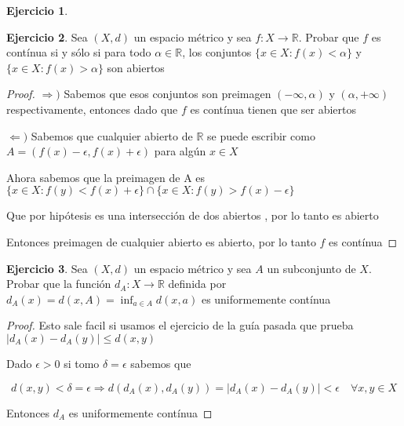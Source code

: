 \documentclass[11pt]{report}
\newcommand{\R}{\mathbb{R}}
\newcommand{\Ra}{\Rightarrow}
\newcommand{\ra}{\rightarrow}
\theoremstyle{definition}
\newtheorem{ej}{Ejercicio}
\begin{document}
	\begin{ej}
		
	\end{ej}

	\begin{ej}
		Sea $(X,d)$ un espacio métrico y sea $f: X \ra \R$. Probar que $f$ es contínua si y sólo si para todo $\alpha \in \R$, los conjuntos $\{x \in X: f(x) < \alpha\}$ y $\{x\in X : f(x) > \alpha\}$ son abiertos
		\begin{proof}
			$\Ra ) $ Sabemos que esos conjuntos son preimagen $(- \infty , \alpha)$ y $(\alpha,+\infty)$ respectivamente, entonces dado que $f$ es contínua tienen que ser abiertos

			$\Leftarrow )$ Sabemos que cualquier abierto de $\R$ se puede escribir como $A = (f(x) - \epsilon,f(x) + \epsilon)$ para algún $x \in X$

			Ahora sabemos que la preimagen de A es $\{x \in X : f(y) < f(x) + \epsilon \} \cap \{x \in X : f(y) >  f(x) - \epsilon\}$

			Que por hipótesis es una intersección de dos abiertos , por lo tanto es abierto 

			Entonces preimagen de cualquier abierto es abierto, por lo tanto $f$ es contínua
		\end{proof}
		
		
	\end{ej}
	
	\begin{ej}
		Sea $(X,d)$ un espacio métrico y sea $A$ un subconjunto de $X$. Probar que la función $d_A: X \ra \R$ definida por $d_A(x) = d(x,A) = \inf_{a\in A}d(x,a)$ es uniformemente contínua

		\begin{proof}
			Esto sale facil si usamos el ejercicio de la guía pasada que prueba $|d_A(x) - d_A(y)| \leq  d(x,y)$

			Dado $\epsilon >0 $ si tomo $\delta = \epsilon$ sabemos que 

			$$d(x,y) < \delta = \epsilon \Ra d(d_A(x),d_A(y)) = |d_A(x)-d_A(y)| < \epsilon \quad \forall x,y \in X$$

			Entonces $d_A$ es uniformemente contínua
		\end{proof}
		
		
	\end{ej}
	
	
\end{document}
